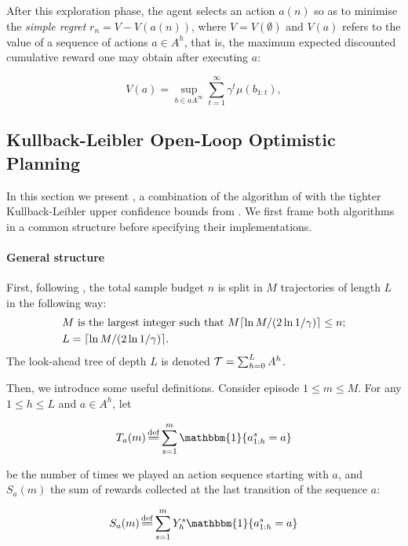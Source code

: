 After this exploration phase, the agent selects an action $a(n)$ so as to minimise the \emph{simple regret} $r_n = V - V(a(n))$, where $V=V(\emptyset)$ and $V(a)$ refers to the value of a sequence of actions $a\in A^h$, that is, the maximum expected discounted cumulative reward one may obtain after executing $a$:


\begin{equation}
\label{eq:value}
V(a) = \sup_{b\in aA^\infty} \sum_{t=1}^\infty \gamma^t\mu(b_{1:t}),
\end{equation}


\subsection{Kullback-Leibler Open-Loop Optimistic Planning}
\label{sec:kl-olop}

In this section we present \KLOLOP, a combination of the \OLOP algorithm of \citep{Bubeck2010} with the tighter Kullback-Leibler upper confidence bounds from \citep{Cappe2013}. We first frame both algorithms in a common structure before specifying their implementations.

\paragraph{General structure}

First, following \OLOP, the total sample budget $n$ is split in $M$ trajectories of length $L$ in the following way: 
\begin{align*}
&M\text{ is the largest integer such that } M \lceil\ln M/(2 \ln 1/\gamma)\rceil \leq n;\\
&L= \lceil\ln M / (2 \ln 1/\gamma)\rceil.
\end{align*}
The look-ahead tree of depth $L$ is denoted $\mathcal{T} = \sum_{h=0}^L A^h$.

Then, we introduce some useful definitions. Consider episode $1 \leq m \leq M$. For any $1 \leq h \leq L$ and $a\in A^h$, let 


\begin{equation*}
T_a(m) \eqdef \sum_{s=1}^m \mathbbm{1}\{a^s_{1:h} = a\}
\end{equation*}


\noindent
be the number of times we played an action sequence starting with $a$, and $S_a(m)$ the sum of rewards collected at the last transition of the sequence $a$:


\begin{equation*}
S_a(m) \eqdef \sum_{s=1}^m Y^s_h \mathbbm{1}\{a^s_{1:h} = a\}
\end{equation*}


